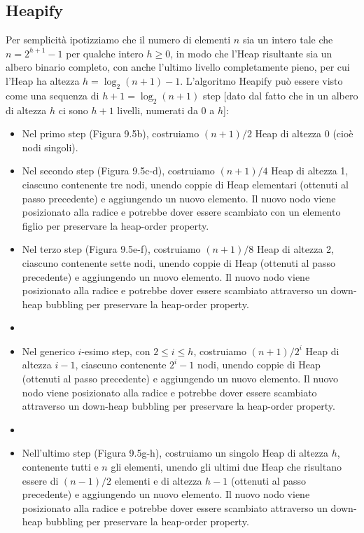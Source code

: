 \subsection*{Heapify}
Per semplicità ipotizziamo che il numero di elementi $n$ sia un intero tale che $n = 2^{h+1} - 1$ per qualche intero $h \geq 0$, in modo che l'Heap risultante sia un albero binario completo, con anche l'ultimo livello completamente pieno, per cui l'Heap ha altezza $h = \log_2(n+1) - 1$. L'algoritmo Heapify può essere visto come una sequenza di $h + 1 = \log_2(n + 1)$ step [dato dal fatto che in un albero di altezza $h$ ci sono $h + 1$ livelli, numerati da 0 a $h$]:

\begin{itemize}[labelwidth=!, leftmargin=*, align=right]
    \item[1.] Nel primo step (Figura 9.5b), costruiamo $(n+1)/2$ Heap di altezza 0 (cioè nodi singoli).

    \item[2.] Nel secondo step (Figura 9.5c-d), costruiamo $(n+1)/4$ Heap di altezza 1, ciascuno contenente tre nodi, unendo coppie di Heap elementari (ottenuti al passo precedente) e aggiungendo un nuovo elemento. Il nuovo nodo viene posizionato alla radice e potrebbe dover essere scambiato con un elemento figlio per preservare la heap-order property.

    \item[3.] Nel terzo step (Figura 9.5e-f), costruiamo $(n+1)/8$ Heap di altezza 2, ciascuno contenente sette nodi, unendo coppie di Heap (ottenuti al passo precedente) e aggiungendo un nuovo elemento. Il nuovo nodo viene posizionato alla radice e potrebbe dover essere scambiato attraverso un down-heap bubbling per preservare la heap-order property.
    
    \item[$\vdots$]

    \item[i.] Nel generico $i$-esimo step, con $2 \le i \le h$, costruiamo $(n+1)/2^i$ Heap di altezza $i-1$, ciascuno contenente $2^i - 1$ nodi, unendo coppie di Heap (ottenuti al passo precedente) e aggiungendo un nuovo elemento. Il nuovo nodo viene posizionato alla radice e potrebbe dover essere scambiato attraverso un down-heap bubbling per preservare la heap-order property.

    \item[$\vdots$]

    \item[$h+1$.] Nell'ultimo step (Figura 9.5g-h), costruiamo un singolo Heap di altezza $h$, contenente tutti e $n$ gli elementi, unendo gli ultimi due Heap che risultano essere di $(n - 1)/2$ elementi e di altezza $h - 1$ (ottenuti al passo precedente) e aggiungendo un nuovo elemento. Il nuovo nodo viene posizionato alla radice e potrebbe dover essere scambiato attraverso un down-heap bubbling per preservare la heap-order property.
\end{itemize}

